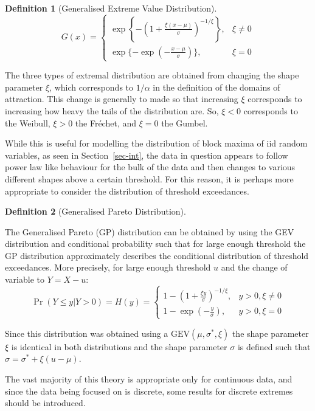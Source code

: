 \documentclass[
  10pt,
  a4paper,
]{scrreprt}
\theoremstyle{plain}
\theoremstyle{definition}
\newtheorem{definition}{Definition}[section]
\theoremstyle{remark}
\begin{document}
{\begin{definition}[Generalised Extreme Value
Distribution]
\[
G(x) = \begin{cases}\exp\left\{-\left(1+\frac{\xi(x-\mu)}{\sigma}\right)^{-1/\xi}\right\},&\xi\ne0\\
\exp\{-\exp(-\frac{x-\mu}{\sigma})\},&\xi=0
\end{cases}
\]

\end{definition}

The three types of extremal distribution are obtained from changing the
shape parameter \(\xi\), which corresponds to \(1/\alpha\) in the
definition of the domains of attraction. This change is generally to
made so that increasing \(\xi\) corresponds to increasing how heavy the
tails of the distribution are. So, \(\xi<0\) corresponds to the Weibull,
\(\xi>0\) the Fréchet, and \(\xi=0\) the Gumbel.

While this is useful for modelling the distribution of block maxima of
iid random variables, as seen in Section~\ref{sec-int}, the data in
question appears to follow power law like behaviour for the bulk of the
data and then changes to various different shapes above a certain
threshold. For this reason, it is perhaps more appropriate to consider
the distribution of threshold exceedances.

\begin{definition}[Generalised Pareto
Distribution]\protect\hypertarget{def-gp}{}\label{def-gp}

The Generalised Pareto (GP) distribution can be obtained by using the
GEV distribution and conditional probability such that for large enough
threshold the GP distribution approximately describes the conditional
distribution of threshold exceedances. More precisely, for large enough
threshold \(u\) and the change of variable to \(Y=X-u\): \[
\Pr(Y\le y | Y>0) = H(y) = \begin{cases}
1-\left(1+\frac{\xi y}{\sigma}\right)^{-1/\xi},&y>0,\xi\ne 0 \\
1-\exp\left(-\frac{y}{\sigma}\right),&y>0,\xi = 0
\end{cases}
\]

\end{definition}

Since this distribution was obtained using a
\(\text{GEV}(\mu,\sigma^*,\xi)\) the shape parameter \(\xi\) is
identical in both distributions and the shape parameter \(\sigma\) is
defined such that \(\sigma = \sigma^* + \xi(u-\mu)\).

The vast majority of this theory is appropriate only for continuous
data, and since the data being focused on is discrete, some results for
discrete extremes should be introduced.

}
\end{document}
